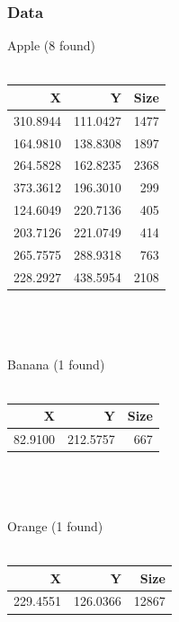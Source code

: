 \documentclass{article}
\begin{document}
\subsubsection{Data}
Apple (8 found)\\~\\
\begin{tabular}{ | r | r | r | }
\hline
\textbf{X} & \textbf{Y} & \textbf{Size}\\
\hline
310.8944 & 111.0427 & 1477\\
\hline
164.9810 & 138.8308 & 1897\\
\hline
264.5828 & 162.8235 & 2368\\
\hline
373.3612 & 196.3010 & 299\\
\hline
124.6049 & 220.7136 & 405\\
\hline
203.7126 & 221.0749 & 414\\
\hline
265.7575 & 288.9318 & 763\\
\hline
228.2927 & 438.5954 & 2108\\
\hline
\end{tabular}
~\\~\\~\\
Banana (1 found)\\~\\
\begin{tabular}{ | r | r | r | }
\hline
\textbf{X} & \textbf{Y} & \textbf{Size}\\
\hline
82.9100 & 212.5757 & 667\\
\hline
\end{tabular}
~\\~\\~\\
Orange (1 found)\\~\\
\begin{tabular}{ | r | r | r | }
\hline
\textbf{X} & \textbf{Y} & \textbf{Size}\\
\hline
229.4551 & 126.0366 & 12867\\
\hline
\end{tabular}
\end{document}
